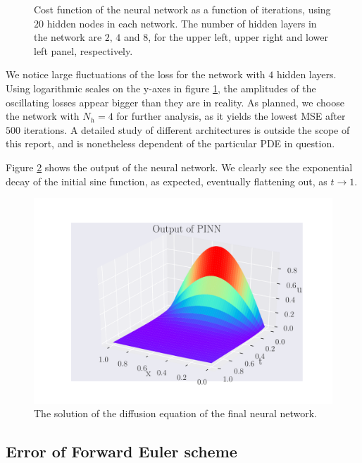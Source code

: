 \documentclass[12pt]{extarticle}
\begin{document}
\begin{figure}[h]
	\endminipage\hfill
	\caption{Cost function of the neural network as a function of iterations, using $20$ hidden nodes in each network. The number of hidden layers in the network are $2,\,4$ and $8$, for the upper left, upper right and lower left panel, respectively.} \label{fig:Error_NN_architecture}
	\endminipage
\end{figure}

We notice large fluctuations of the loss for the network with $4$ hidden layers. Using logarithmic scales on the y-axes in figure \ref{fig:Error_NN_architecture}, the amplitudes of the oscillating losses appear bigger than they are in reality. As planned, we choose the network with $N_h=4$ for further analysis, as it yields the lowest MSE after $500$ iterations. A detailed study of different architectures is outside the scope of this report, and is nonetheless dependent of the particular PDE in question. 


Figure \ref{fig:NN_architecture_solution} shows the output of the neural network. We clearly see the exponential decay of the initial sine function, as expected, eventually flattening out, as $t\to1$.   
\begin{figure}[h]
	\centering
	\includegraphics[width=\linewidth]{../output/plots/NN_diffusion_solution_Nn20_Nh4.pdf}
	\caption{The solution of the diffusion equation of the final neural network.} \label{fig:NN_architecture_solution}
\end{figure}


\subsection{Error of Forward Euler scheme}
\end{document}
